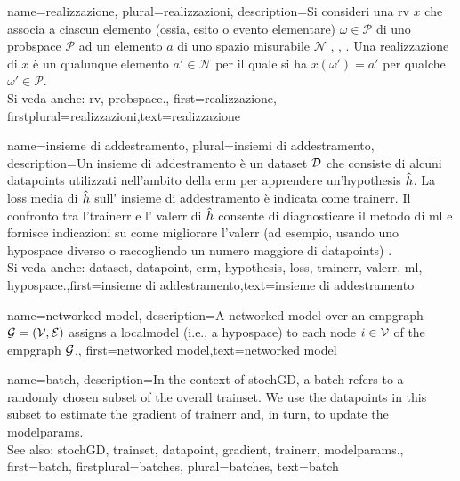 	
{name={realizzazione}, plural={realizzazioni},
	description={Si consideri una \gls{rv} $x$ che associa a 
	ciascun elemento (ossia, esito o evento elementare) $\omega \in \mathcal{P}$ di uno \gls{probspace} $\mathcal{P}$ 
	ad un elemento $a$ di uno spazio misurabile $\mathcal{N}$ \cite{RudinBookPrinciplesMatheAnalysis}, \cite{HalmosMeasure}, \cite{BillingsleyProbMeasure}. 
	Una realizzazione di $x$ è un qualunque elemento $a' \in \mathcal{N}$ per il quale si ha 
	$x(\omega') = a'$ per qualche $\omega' \in \mathcal{P}$.
			\\
		Si veda anche: \gls{rv}, \gls{probspace}.}, first={realizzazione}, firstplural={realizzazioni},text={realizzazione}  }

{name={insieme di addestramento}, plural={insiemi di addestramento},
description={Un insieme di addestramento è un \gls{dataset} $\mathcal{D}$ che consiste di alcuni \glspl{datapoint} utilizzati nell'ambito della \gls{erm} 
	per apprendere un'\gls{hypothesis} $\hat{h}$. La \gls{loss} media di $\hat{h}$ sull' 
	insieme di addestramento è indicata come \gls{trainerr}. Il confronto tra l'\gls{trainerr} e l' 
	\gls{valerr} di $\hat{h}$ consente di diagnosticare il metodo di \gls{ml} e fornisce indicazioni su come migliorare  
	l'\gls{valerr} (ad esempio, usando uno \gls{hypospace} diverso o raccogliendo un numero maggiore di \glspl{datapoint}) \cite[Sec. 6.6]{MLBasics}.
			\\
		Si veda anche: \gls{dataset}, \gls{datapoint}, \gls{erm}, \gls{hypothesis}, \gls{loss}, \gls{trainerr}, \gls{valerr}, \gls{ml}, \gls{hypospace}.},first={insieme di addestramento},text={insieme di addestramento}  
}

{name={networked model},
  description={A networked \gls{model} over an \gls{empgraph} $\mathcal{G} = \left( \mathcal{V},\mathcal{E} \right)$ assigns 
   a \gls{localmodel} (i.e., a \gls{hypospace}) to each node $i \in \mathcal{V}$ of the \gls{empgraph} $\mathcal{G}$.}, 
   first={networked model},text={networked model}  
}

{name={batch},
 description={In the context of \gls{stochGD}, a batch refers to a randomly 
	chosen subset of the overall \gls{trainset}. We use the \glspl{datapoint} in this subset 
	to estimate the \gls{gradient} of \gls{trainerr} and, in turn, to update the \gls{modelparams}.
			\\
		See also: \gls{stochGD}, \gls{trainset}, \gls{datapoint}, \gls{gradient}, \gls{trainerr}, \gls{modelparams}.}, 
 first={batch},
 firstplural={batches}, 
 plural={batches}, 
 text={batch}  
}

